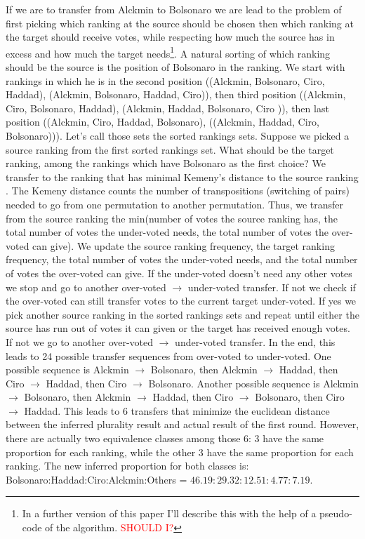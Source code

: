 \documentclass[hidelinks,11pt]{article}
\begin{document}
 If we are to transfer from Alckmin to Bolsonaro we are lead to the problem of first
picking which ranking at the source should be chosen then which ranking at the
target should receive votes, while respecting how much the source has in excess
and how much the target needs\footnote{In a further version of this paper
  I'll describe this with the help of a pseudo-code of the algorithm. \textcolor{red}{SHOULD I?}}. A
natural sorting of which ranking should be the source is the position of
Bolsonaro in the ranking. We start with rankings in which he is in the second
position ((Alckmin, Bolsonaro, Ciro, Haddad), (Alckmin, Bolsonaro, Haddad,
Ciro)), then third position ((Alckmin, Ciro, Bolsonaro, Haddad), (Alckmin,
Haddad, Bolsonaro, Ciro )), then last position ((Alckmin, Ciro, Haddad,
Bolsonaro), ((Alckmin, Haddad, Ciro, Bolsonaro))). Let's call those sets the
sorted rankings sets. Suppose we picked a source ranking from the first sorted
rankings set. What should be the target ranking, among the rankings which have
Bolsonaro as the first choice? We transfer to the ranking that has minimal
Kemeny's distance to the source ranking \parencite{nurmi2002voting}. The Kemeny
distance counts the number of transpositions (switching of pairs) needed to go
from one permutation to another permutation. Thus, we transfer from the source
ranking the min(number of votes the source ranking has, the total number of
votes the under-voted needs, the total number of votes the over-voted can give).
We update the source ranking frequency, the target ranking frequency, the total
number of votes the under-voted needs, and the total number of votes the
over-voted can give. If the under-voted doesn't need any other votes we stop and
go to another over-voted \(\to\) under-voted transfer. If not we check if the
over-voted can still transfer votes to the current target under-voted. If yes we
pick another source ranking in the sorted rankings sets and repeat until either
the source has run out of votes it can given or the target has received enough
votes. If not we go to another over-voted \(\to\) under-voted transfer. In the end, this leads to 24 possible transfer sequences from over-voted
to under-voted. One possible sequence is Alckmin \(\to\) Bolsonaro, then Alckmin
\(\to\) Haddad, then Ciro \(\to\) Haddad, then Ciro \(\to\) Bolsonaro. Another
possible sequence is  Alckmin \(\to\) Bolsonaro, then Alckmin \(\to\) Haddad, then
Ciro \(\to\) Bolsonaro, then Ciro \(\to\) Haddad. This leads to 6 transfers that
minimize the euclidean distance between the inferred plurality result and actual
result of the first round. However, there are actually two equivalence classes
among those 6: 3 have the same proportion for each ranking, while the other 3
have the same proportion for each ranking. The new inferred proportion for both
classes is: Bolsonaro:Haddad:Ciro:Alckmin:Others =
\(46.19:29.32:12.51:4.77:7.19 \).
\end{document}
